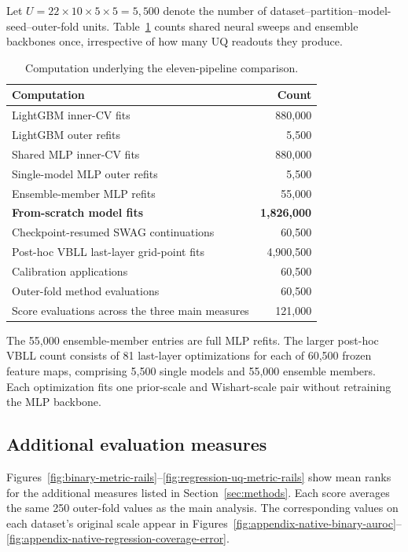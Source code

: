 Let $U=22\times10\times5\times5=5{,}500$ denote the number of
dataset--partition--model-seed--outer-fold units. Table~\ref{tab:compute-counts} counts shared
neural sweeps and ensemble backbones once, irrespective of how many UQ readouts they produce.

\begin{table}[!htbp]
\centering
\caption{Computation underlying the eleven-pipeline comparison.}
\label{tab:compute-counts}
\small
\begin{tabularx}{\linewidth}{@{}Xr@{}}
\toprule
Computation & Count \\
\midrule
LightGBM inner-CV fits & 880,000 \\
LightGBM outer refits & 5,500 \\
Shared MLP inner-CV fits & 880,000 \\
Single-model MLP outer refits & 5,500 \\
Ensemble-member MLP refits & 55,000 \\
\textbf{From-scratch model fits} & \textbf{1,826,000} \\
Checkpoint-resumed SWAG continuations & 60,500 \\
Post-hoc VBLL last-layer grid-point fits & 4,900,500 \\
Calibration applications & 60,500 \\
Outer-fold method evaluations & 60,500 \\
Score evaluations across the three main measures & 121,000 \\
\bottomrule
\end{tabularx}
\end{table}

The 55,000 ensemble-member entries are full MLP refits. The larger post-hoc VBLL count consists of
81 last-layer optimizations for each of 60,500 frozen feature maps, comprising 5,500 single models
and 55,000 ensemble members. Each optimization fits one prior-scale and Wishart-scale pair without
retraining the MLP backbone.
\FloatBarrier

\subsection{Additional evaluation measures}

Figures~\ref{fig:binary-metric-rails}--\ref{fig:regression-uq-metric-rails} show mean ranks for the
additional measures listed in Section~\ref{sec:methods}. Each score averages the same 250 outer-fold
values as the main analysis. The corresponding values on each dataset's original scale appear in
Figures~\ref{fig:appendix-native-binary-auroc}--\ref{fig:appendix-native-regression-coverage-error}.

